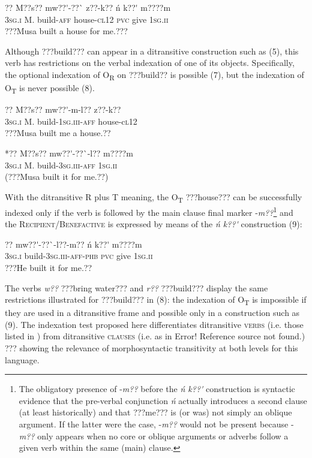 \documentclass[output=paper]{langsci/langscibook}
\begin{document}
\ea \gll 
\label{bkm:Ref446636188}??    M??s??  mw??\'{ }-??\`{ }    z??-k??    \'{n}  k??\'{ }  m????m
\\
%
\textsc{3sg.i  }  M.  build-\textsc{aff}  house\textsc{{}-cl12}  \textsc{pvc}  give  \textsc{1sg.ii}
\\\glt
???Musa built a house for me.???
\z

Although ???build??? can appear in a ditransitive construction such as (5), this verb has restrictions on the verbal indexation of one of its objects. Specifically, the optional indexation of O\textsubscript{R} on ???build?? is possible (7), but the indexation of O\textsubscript{T} is never possible (8).

\ea \gll 
\label{bkm:Ref446636228}??    M??s??  mw??\'{ }-m-l??    z??-k??
\\
%
\textsc{3sg.i  }  M.  build-\textsc{1sg.iii-aff}  house-c\textsc{l12}
\\\glt
???Musa built me a house.??
\z

\ea \gll 
\label{bkm:Ref446636239}*??    M??s??  mw??\'{ }-??\`{ }-l??    m????m
\\
%
\textsc{3sg.i  }  M.  build-\textsc{3sg.iii-aff}  \textsc{1sg.ii}
\\\glt
(???Musa built it for me.??)
\z

With the ditransitive R plus T meaning, the O\textsubscript{T} ???house??? can be successfully indexed only if the verb is followed by the main clause final marker -\textit{m??}\footnote{ The obligatory presence of -\textit{m??} before the \textit{\'{n} k??\'{ }} construction is syntactic evidence that the pre-verbal conjunction \textit{\'{n} }actually introduces a second clause (at least historically) and that ???me??? is (or was) not simply an oblique argument. If the latter were the case, -\textit{m??} would not be present because -\textit{m??} only appears when no core or oblique arguments or adverbs follow a given verb within the same (main) clause.}{ }and the \textsc{Recipient/Benefactive} is expressed by means of the \textit{\'{n} k??\'{ }} construction (9):


\ea \gll 
\label{bkm:Ref446636254}??    mw??\'{ }-??\`{ }-l??-m??      \'{n}  k??\'{ }  m????m
\\
%
\textsc{3sg.i  }  build-\textsc{3sg.iii-aff-phb}  \textsc{pvc}  give\textsc{  1sg.ii}
\\\glt
???He built it for me.??
\z

The verbs \textit{w??} ???bring water??? and \textit{r??} ???build??? display the same restrictions illustrated for ???build??? in (8): the indexation of O\textsubscript{T} is impossible if they are used in a ditransitive frame and possible only in a construction such as (9). The indexation test proposed here differentiates ditransitive \textsc{verbs} (i.e. those listed in ) from ditransitive \textsc{clauses} (i.e. as in Error! Reference source not found.) ??? showing the relevance of morphosyntactic transitivity at both levels for this language.
\end{document}
